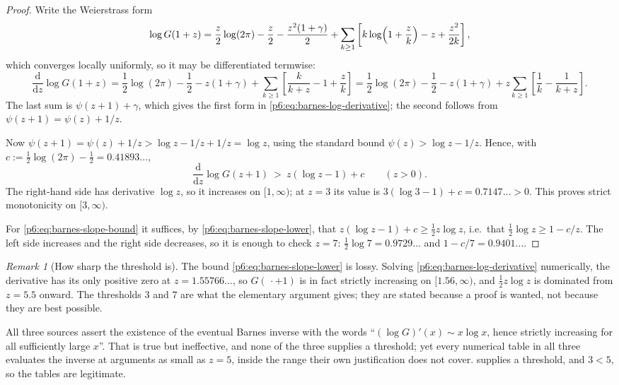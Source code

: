 \documentclass[11pt,a4paper,oneside]{book}
\theoremstyle{plain}
\theoremstyle{definition}
\theoremstyle{remark}
\newtheorem{remark}[theorem]{Remark}
\newcommand{\dd}{\mathrm{d}}
\begin{document}
\begin{proof}
Write the Weierstrass form
\[
 \log G(1+z)=\frac z2\log(2\pi)-\frac{z}{2}-\frac{z^{2}(1+\gamma)}2
 +\sum_{k\ge1}\left[k\log\Bigl(1+\frac zk\Bigr)-z+\frac{z^{2}}{2k}\right],
\]
which converges locally uniformly, so it may be differentiated termwise:
\[
 \frac{\dd}{\dd z}\log G(1+z)
 =\frac12\log(2\pi)-\frac12-z(1+\gamma)
 +\sum_{k\ge1}\left[\frac{k}{k+z}-1+\frac zk\right]
 =\frac12\log(2\pi)-\frac12-z(1+\gamma)
 +z\sum_{k\ge1}\left[\frac1k-\frac1{k+z}\right].
\]
The last sum is $\psi(z+1)+\gamma$, which gives the first form in
\eqref{p6:eq:barnes-log-derivative}; the second follows from
$\psi(z+1)=\psi(z)+1/z$.

Now $\psi(z+1)=\psi(z)+1/z>\log z-1/z+1/z=\log z$, using the standard bound
$\psi(z)>\log z-1/z$.  Hence, with $c:=\tfrac12\log(2\pi)-\tfrac12
=0.41893\ldots$,
\begin{equation}\label{p6:eq:barnes-slope-lower}
 \frac{\dd}{\dd z}\log G(z+1)\ >\ z(\log z-1)+c
 \qquad(z>0).
\end{equation}
The right-hand side has derivative $\log z$, so it increases on $[1,\infty)$;
at $z=3$ its value is $3(\log3-1)+c=0.7147\ldots>0$.  This proves strict
monotonicity on $[3,\infty)$.

For \eqref{p6:eq:barnes-slope-bound} it suffices, by
\eqref{p6:eq:barnes-slope-lower}, that $z(\log z-1)+c\ge\tfrac12z\log z$, i.e.\
that $\tfrac12\log z\ge1-c/z$.  The left side increases and the right side
decreases, so it is enough to check $z=7$: $\tfrac12\log7=0.9729\ldots$ and
$1-c/7=0.9401\ldots$.
\end{proof}

\begin{remark}[How sharp the threshold is]\label{p6:rem:threshold}
The bound \eqref{p6:eq:barnes-slope-lower} is lossy.  Solving
\eqref{p6:eq:barnes-log-derivative} numerically, the derivative has its only
positive zero at $z=1.55766\ldots$, so $G(\,\cdot+1)$ is in fact strictly
increasing on $[1.56,\infty)$, and $\tfrac12z\log z$ is dominated from
$z=5.5$ onward.  The thresholds $3$ and $7$ are what the elementary argument
gives; they are stated because a proof is wanted, not because they are best
possible.
\end{remark}

\begin{repairbox}
All three sources assert the existence of the eventual Barnes inverse with the
words ``$(\log G)'(x)\sim x\log x$, hence strictly increasing for all
sufficiently large $x$''.  That is true but ineffective, and none of the three
supplies a threshold; yet every numerical table in all three evaluates the
inverse at arguments as small as $z=5$, inside the range their own
justification does not cover.  \Cref{p6:prop:barnes-monotone} supplies a
threshold, and $3<5$, so the tables are legitimate.
\end{repairbox}
\end{document}
